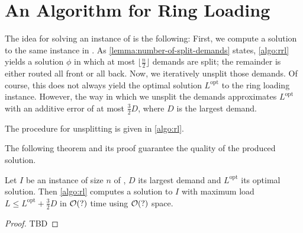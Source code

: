 \section{An Algorithm for Ring Loading}
\label{sec:ring-loading}

The idea for solving an instance of \RL is the following:
First, we compute a solution to the same instance in \RRL.
As \cref{lemma:number-of-split-demands} states, \cref{algo:rrl} yields a solution $\phi$ in which at most $\lfloor\frac{n}{2}\rfloor$ demands are split; the remainder is either routed all front or all back.
Now, we iteratively unsplit those demands.
Of course, this does not always yield the optimal solution $L^\mathrm{opt}$ to the ring loading instance.
However, the way in which we unsplit the demands approximates $L^\mathrm{opt}$ with an additive error of at most $\frac{3}{2}D$, where $D$ is the largest demand.

The procedure for unsplitting is given in \cref{algo:rl}.



The following theorem and its proof guarantee the quality of the produced solution.
\begin{theorem}
	\label{theo:ring-loading-algorithm}
	Let $I$ be an instance of size $n$ of \RL, $D$ its largest demand and $L^\mathrm{opt}$ its optimal solution.
	Then \cref{algo:rl} computes a solution to $I$ with maximum load $L \leq L^\mathrm{opt} + \frac{3}{2} D$ in $\mathcal{O}(?)$ time using $\mathcal{O}(?)$ space.
\end{theorem}
\begin{proof}
	TBD
\end{proof}

